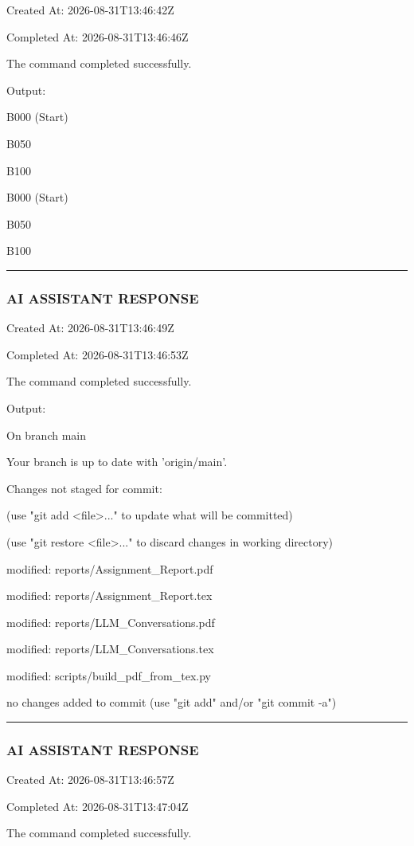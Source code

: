\documentclass[11pt,a4paper]{article}
\begin{document}
{{{Created At: 2026-08-31T13:46:42Z

Completed At: 2026-08-31T13:46:46Z


The command completed successfully.

Output:

B000 (Start)

B050

B100

B000 (Start)

B050

B100


\hrule

\subsubsection{AI ASSISTANT RESPONSE}

Created At: 2026-08-31T13:46:49Z

Completed At: 2026-08-31T13:46:53Z


The command completed successfully.

Output:

On branch main

Your branch is up to date with 'origin/main'.


Changes not staged for commit:

(use "git add <file>..." to update what will be committed)

(use "git restore <file>..." to discard changes in working directory)

modified:   reports/Assignment\_Report.pdf

modified:   reports/Assignment\_Report.tex

modified:   reports/LLM\_Conversations.pdf

modified:   reports/LLM\_Conversations.tex

modified:   scripts/build\_pdf\_from\_tex.py


no changes added to commit (use "git add" and/or "git commit -a")


\hrule

\subsubsection{AI ASSISTANT RESPONSE}

Created At: 2026-08-31T13:46:57Z

Completed At: 2026-08-31T13:47:04Z


The command completed successfully.

}}}
\end{document}
